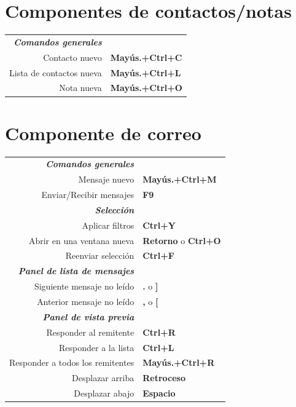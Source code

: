 \documentclass[12pt]{article}
\begin{document}
\begin{landscape}
\begin{center}
\begin{multicols}{2}
	\section*{Componentes de contactos/notas}
	\begin{tabular*}{4in}{rp{1.5in}}
		\textit{\textbf{Comandos generales}}	&					\\
		Contacto nuevo				& \textbf{Mayús.+Ctrl+C}		\\
		Lista de contactos nueva		& \textbf{Mayús.+Ctrl+L}		\\
		Nota nueva				& \textbf{Mayús.+Ctrl+O}		\\
	\end{tabular*}
	\section*{Componente de correo}
	\begin{tabular*}{4in}{rp{1.5in}}
		\textit{\textbf{Comandos generales}}	&					\\
		Mensaje nuevo				& \textbf{Mayús.+Ctrl+M}		\\
		\vspace{1.5mm}
		Enviar/Recibir mensajes			& \textbf{F9}				\\
		\textit{\textbf{Selección}}		&					\\
		Aplicar filtros				& \textbf{Ctrl+Y}			\\
		Abrir en una ventana nueva		& \textbf{Retorno} o \textbf{Ctrl+O}	\\
		\vspace{1.5mm}
		Reenviar selección			& \textbf{Ctrl+F}			\\
		\textit{\textbf{Panel de lista de mensajes}} &					\\
		Siguiente mensaje no leído		& \textbf{.} o \textbf{]}		\\
		\vspace{1.5mm}
		Anterior mensaje no leído		& \textbf{,} o \textbf{[}		\\
		\textit{\textbf{Panel de vista previa}}	&					\\
		Responder al remitente			& \textbf{Ctrl+R}			\\
		Responder a la lista			& \textbf{Ctrl+L}			\\
		Responder a todos los remitentes	& \textbf{Mayús.+Ctrl+R}		\\
		Desplazar arriba			& \textbf{Retroceso}			\\
		Desplazar abajo				& \textbf{Espacio}			\\
	\end{tabular*}

\end{multicols}
\end{center}
\end{landscape}
\end{document}
